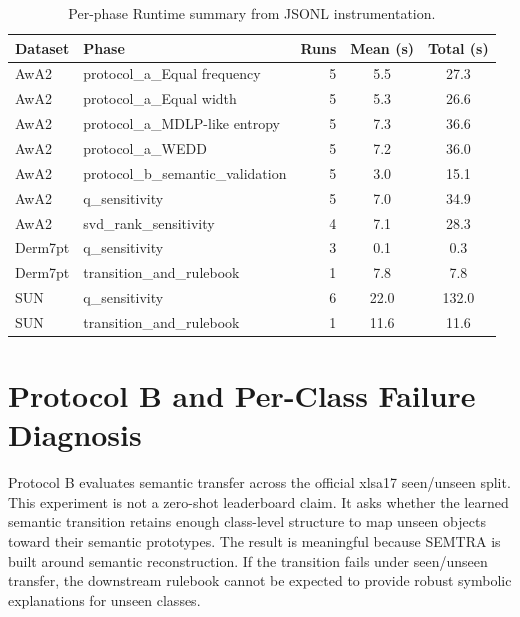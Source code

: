 \documentclass[make,supfile,submit,pdftex,moreauthors]{Definitions/mdpi}
\begin{document}
\begin{table}[H]
\caption{Per-phase Runtime summary from JSONL instrumentation.\label{tab:supp_runtime_breakdown}}
\centering
\small
\begin{tabularx}{\textwidth}{llRCC}
\toprule
\textbf{Dataset} & \textbf{Phase} & \textbf{Runs} & \textbf{Mean (s)} & \textbf{Total (s)} \\
\midrule
AwA2 & protocol\_a\_Equal frequency & 5 & 5.5 & 27.3 \\
AwA2 & protocol\_a\_Equal width & 5 & 5.3 & 26.6 \\
AwA2 & protocol\_a\_MDLP-like entropy & 5 & 7.3 & 36.6 \\
AwA2 & protocol\_a\_WEDD & 5 & 7.2 & 36.0 \\
AwA2 & protocol\_b\_semantic\_validation & 5 & 3.0 & 15.1 \\
AwA2 & q\_sensitivity & 5 & 7.0 & 34.9 \\
AwA2 & svd\_rank\_sensitivity & 4 & 7.1 & 28.3 \\
Derm7pt & q\_sensitivity & 3 & 0.1 & 0.3 \\
Derm7pt & transition\_and\_rulebook & 1 & 7.8 & 7.8 \\
SUN & q\_sensitivity & 6 & 22.0 & 132.0 \\
SUN & transition\_and\_rulebook & 1 & 11.6 & 11.6 \\
\bottomrule
\end{tabularx}
\end{table}

\section{Protocol B and Per-Class Failure Diagnosis}
\label{sec:supp_protocol_b}

Protocol B evaluates semantic transfer across the official xlsa17 seen/unseen split. This experiment is not a zero-shot leaderboard claim. It asks whether the learned semantic transition retains enough class-level structure to map unseen objects toward their semantic prototypes. The result is meaningful because SEMTRA is built around semantic reconstruction. If the transition fails under seen/unseen transfer, the downstream rulebook cannot be expected to provide robust symbolic explanations for unseen classes.
\end{document}
